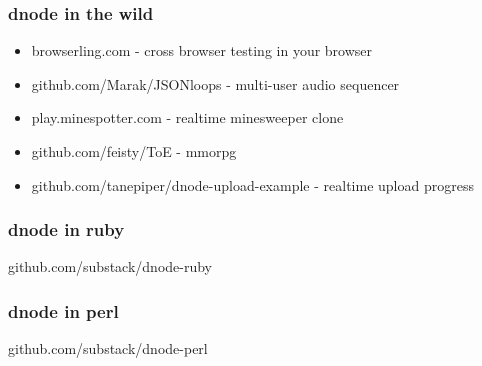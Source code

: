 \documentclass{beamer}
\begin{document}
\begin{frame}
    \frametitle{dnode in the wild}
    \begin{itemize}
    
    \item browserling.com - cross browser testing in your browser
    \pause
    
    \item github.com/Marak/JSONloops - multi-user audio sequencer
    \pause
    
    \item play.minespotter.com - realtime minesweeper clone
    \pause
    
    \item github.com/feisty/ToE - mmorpg
    \pause
    
    \item github.com/tanepiper/dnode-upload-example - realtime upload progress
    
    \end{itemize}
\end{frame}

\begin{frame}
    \frametitle{dnode in ruby}
    \begin{center}
        \huge
        github.com/substack/dnode-ruby
        \newline
        \normalsize
        \fbox{}
    \end{center}
\end{frame}

\begin{frame}
    \frametitle{dnode in perl}
    \begin{center}
        \huge
        github.com/substack/dnode-perl
        \newline
        \normalsize
        \fbox{}
    \end{center}
\end{frame}
\end{document}
